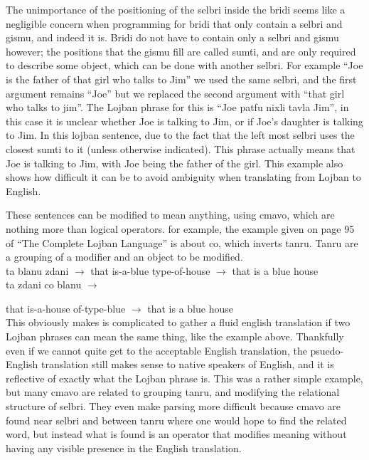 \documentclass[11pt,letterpaper]{article}
\begin{document}
	The unimportance of the positioning of the selbri inside the bridi seems like a negligible concern when programming for bridi that only contain a selbri and gismu, and indeed it is. Bridi do not have to contain only a selbri and gismu however; the positions that the gismu fill are called sumti, and are only required to describe some object, which can be done with another selbri. For example “Joe is the father of that girl who talks to Jim” we used the same selbri, and the first argument remains “Joe” but we replaced the second argument with “that girl who talks to jim”. The Lojban phrase for this is “Joe patfu nixli tavla Jim”, in this case it is unclear whether Joe is talking to Jim, or if Joe’s daughter is talking to Jim. In this lojban sentence, due to the fact that the left most selbri uses the closest sumti to it (unless otherwise indicated). This phrase actually means that Joe is talking to Jim, with Joe being the father of the girl. This example also shows how difficult it can be to avoid ambiguity when translating from Lojban to English.

	These sentences can be modified to mean anything, using cmavo, which are nothing more than logical operators. for example, the example given on page 95 of “The Complete Lojban Language” is about co, which inverts tanru. Tanru are a grouping of a modifier and an object to be modified.\\

ta blanu zdani $\rightarrow$ that is-a-blue type-of-house 
$\rightarrow$ that is a blue house\\

ta zdani co blanu $\rightarrow$

that is-a-house of-type-blue $\rightarrow$
that is a blue house\\


This obviously makes is complicated to gather a fluid english translation if two Lojban phrases can mean the same thing, like the example above. Thankfully even if we cannot quite get to the acceptable English translation, the psuedo-English translation still makes sense to native speakers of English, and it is reflective of exactly what the Lojban phrase is. This was a rather simple example, but many cmavo are related to grouping tanru, and modifying the relational structure of selbri. They even make parsing more difficult because cmavo are found near selbri and between tanru where one would hope to find the related word, but instead what is found is an operator that modifies meaning without having any visible presence in the English translation.
\end{document}
